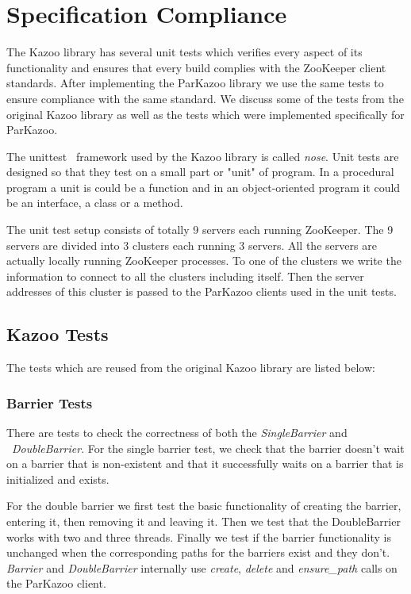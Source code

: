 \chapter{Specification Compliance}

The Kazoo library has several unit tests which verifies every aspect of its functionality and ensures that every build complies with the ZooKeeper client standards. After implementing the ParKazoo library we use the same tests to ensure compliance with the same standard. We discuss some of the tests from the original Kazoo library as well as the tests which were implemented specifically for ParKazoo.

The unittest~\cite{hamill2004unit} framework used by the Kazoo library is called \textit{nose}. Unit tests are designed so that they test on a small part or "unit" of program. In a procedural program a unit is could be a function and in an object-oriented program it could be an interface, a class or a method.

The unit test setup consists of totally 9 servers each running ZooKeeper. The 9 servers are divided into 3 clusters each running 3 servers. All the servers are actually locally running ZooKeeper processes. To one of the clusters we write the information to connect to all the clusters including itself. Then the server addresses of this cluster is passed to the ParKazoo clients used in the unit tests. 

\section{Kazoo Tests}
The tests which are reused from the original Kazoo library are listed below:

	\subsection{Barrier Tests}
	There are tests to check the correctness of both the \textit{SingleBarrier} and ~\textit{DoubleBarrier}. For the single barrier test, we check that the barrier doesn't wait on a barrier that is non-existent and that it successfully waits on a barrier that is initialized and exists.
	
	For the double barrier we first test the basic functionality of creating the barrier, entering it, then removing it and leaving it. Then we test that the DoubleBarrier works with two and three threads. Finally we test if the barrier functionality is unchanged when the corresponding paths for the barriers exist and they don't. \textit{Barrier} and \textit{DoubleBarrier} internally use \textit{create}, \textit{delete} and \textit{ensure\_path} calls on the ParKazoo client.
	
